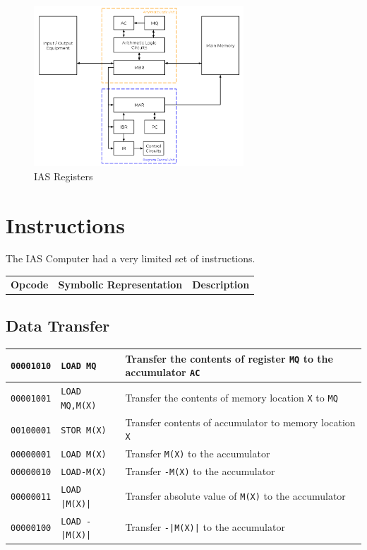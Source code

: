 \begin{figure}[H]
    \centering
    \includegraphics[width=0.7\textwidth]{assets/ias-registers.png}
    \caption{IAS Registers}
\end{figure}

\section*{Instructions}
The IAS Computer had a very limited set of instructions.
\begin{table}[H]
    \centering
    \begin{tabularx}{\textwidth}{XXX}
        \textbf{Opcode} & \textbf{Symbolic Representation} & \textbf{Description}\\
    \end{tabularx}
\end{table}

\subsection*{Data Transfer}
\begin{table}[H]
    \centering
    \begin{tabularx}{\textwidth}{XXX}
        \hline
        \texttt{00001010} & \texttt{LOAD MQ} & Transfer the contents of register \texttt{MQ} to the accumulator \texttt{AC}\\
        \hline
        \texttt{00001001} & \texttt{LOAD MQ,M(X)} & Transfer the contents of memory location \texttt{X} to \texttt{MQ}\\
        \hline
        \texttt{00100001} & \texttt{STOR M(X)} & Transfer contents of accumulator to memory location \texttt{X}\\
        \hline
        \texttt{00000001} & \texttt{LOAD M(X)} & Transfer \texttt{M(X)} to the accumulator\\
        \hline
        \texttt{00000010} & \texttt{LOAD-M(X)} & Transfer \texttt{-M(X)} to the accumulator\\
        \hline
        \texttt{00000011} & \texttt{LOAD |M(X)|} & Transfer absolute value of \texttt{M(X)} to the accumulator\\
        \hline
        \texttt{00000100} & \texttt{LOAD -|M(X)|} & Transfer \texttt{-|M(X)|} to the accumulator\\
        \hline
    \end{tabularx}
\end{table}

